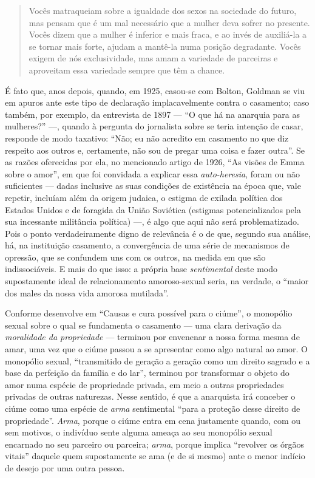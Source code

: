 \begin{quote}
Vocês matraqueiam sobre a igualdade dos sexos na sociedade do futuro,
mas pensam que é um mal necessário que a mulher deva sofrer no presente.
Vocês dizem que a mulher é inferior e mais fraca, e ao invés de
auxiliá-la a se tornar mais forte, ajudam a mantê-la numa posição
degradante. Vocês exigem de nós exclusividade, mas amam a variedade de
parceiras e aproveitam essa variedade sempre que têm a chance.
\end{quote}

É fato que, anos depois, quando, em 1925, casou-se com Bolton, Goldman
se viu em apuros ante este tipo de declaração implacavelmente contra o
casamento; caso também, por exemplo, da entrevista de 1897 --- ``O que há
na anarquia para as mulheres?'' ---, quando à pergunta do jornalista sobre
se teria intenção de casar, responde de modo taxativo: ``Não; eu não
acredito em casamento no que diz respeito aos outros e, certamente, não
sou de pregar uma coisa e fazer outra''. Se as razões oferecidas por
ela, no mencionado artigo de 1926, ``As visões de Emma sobre o amor'',
em que foi convidada a explicar essa \textit{auto-heresia}, foram ou não
suficientes --- dadas inclusive as suas condições de existência na época
que, vale repetir, incluíam além da origem judaica, o estigma de exilada
política dos Estados Unidos e de foragida da União Soviética
(estigmas potencializados pela sua incessante militância política) ---, é
algo que aqui não será problematizado. Pois o ponto verdadeiramente
digno de relevância é o de que, segundo sua análise, há, na instituição
casamento, a convergência de uma série de mecanismos de opressão, que se
confundem uns com os outros, na medida em que são indissociáveis. E mais
do que isso: a própria base \textit{sentimental} deste modo supostamente
ideal de relacionamento amoroso-sexual seria, na verdade, o ``maior dos
males da nossa vida amorosa mutilada''.

Conforme desenvolve em ``Causas e cura possível para o ciúme'', o
monopólio sexual sobre o qual se fundamenta o casamento --- uma clara
derivação da \textit{moralidade da propriedade} --- terminou por envenenar a
nossa forma mesma de amar, uma vez que o ciúme passou a se apresentar
como algo natural ao amor. O monopólio sexual, ``transmitido de
geração a geração como um direito sagrado e a base da perfeição da
família e do lar'', terminou por transformar o objeto do amor numa
espécie de propriedade privada, em meio a outras propriedades privadas
de outras naturezas. Nesse sentido, é que a anarquista irá conceber o
ciúme como uma espécie de \textit{arma} sentimental ``para a proteção desse
direito de propriedade''. \textit{Arma}, porque o ciúme entra em cena
justamente quando, com ou sem motivos, o indivíduo sente alguma ameaça
ao seu monopólio sexual encarnado no seu parceiro ou parceira; \textit{arma},
porque implica ``revolver os órgãos vitais'' daquele quem supostamente
se ama (e de si mesmo) ante o menor indício de desejo por uma outra
pessoa. 

